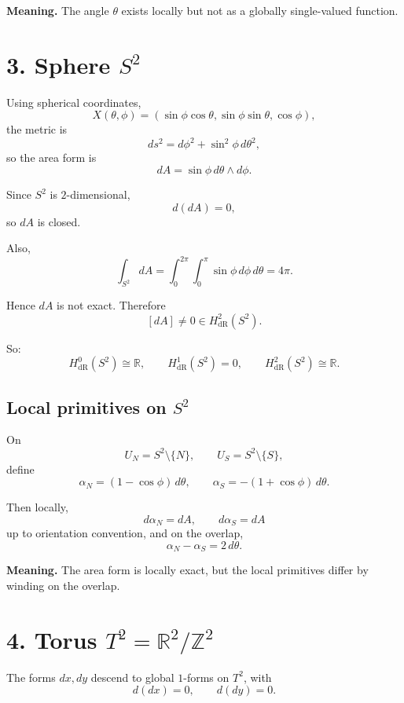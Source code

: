 \documentclass[11pt]{article}
\begin{document}
	\begin{framed}
		\noindent\textbf{Meaning.} The angle \(\theta\) exists locally but not as a globally single-valued function.
	\end{framed}
	
	\section*{3. Sphere \(S^2\)}
	
	Using spherical coordinates,
	\[
	X(\theta,\phi)=(\sin\phi\cos\theta,\sin\phi\sin\theta,\cos\phi),
	\]
	the metric is
	\[
	ds^2=d\phi^2+\sin^2\phi\,d\theta^2,
	\]
	so the area form is
	\[
	dA=\sin\phi\,d\theta\wedge d\phi.
	\]
	
	Since \(S^2\) is \(2\)-dimensional,
	\[
	d(dA)=0,
	\]
	so \(dA\) is closed.
	
	Also,
	\[
	\int_{S^2}dA
	=
	\int_0^{2\pi}\int_0^\pi \sin\phi\,d\phi\,d\theta
	=
	4\pi.
	\]
	
	Hence \(dA\) is not exact. Therefore
	\[
	[dA]\neq 0\in H^2_{\mathrm{dR}}(S^2).
	\]
	
	So:
	\[
	H^0_{\mathrm{dR}}(S^2)\cong \mathbb{R},\qquad
	H^1_{\mathrm{dR}}(S^2)=0,\qquad
	H^2_{\mathrm{dR}}(S^2)\cong \mathbb{R}.
	\]
	
	\subsection*{Local primitives on \(S^2\)}
	
	On
	\[
	U_N=S^2\setminus\{N\},\qquad U_S=S^2\setminus\{S\},
	\]
	define
	\[
	\alpha_N=(1-\cos\phi)\,d\theta,\qquad
	\alpha_S=-(1+\cos\phi)\,d\theta.
	\]
	
	Then locally,
	\[
	d\alpha_N=dA,\qquad d\alpha_S=dA
	\]
	up to orientation convention, and on the overlap,
	\[
	\alpha_N-\alpha_S=2\,d\theta.
	\]
	
	\begin{framed}
		\noindent\textbf{Meaning.} The area form is locally exact, but the local primitives differ by winding on the overlap.
	\end{framed}
	
	\section*{4. Torus \(T^2=\mathbb{R}^2/\mathbb{Z}^2\)}
	
	The forms \(dx,dy\) descend to global \(1\)-forms on \(T^2\), with
	\[
	d(dx)=0,\qquad d(dy)=0.
	\]
	
\end{document}
